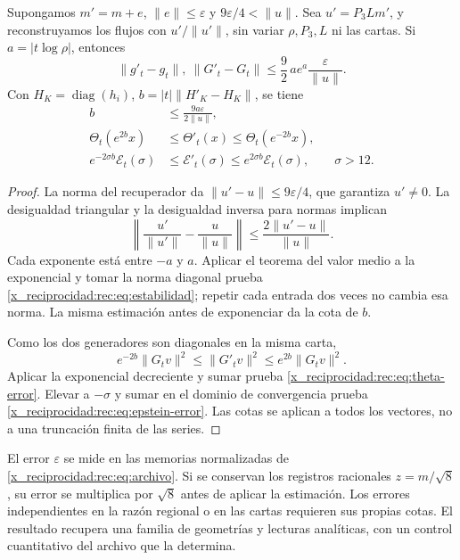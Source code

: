 \begin{theorem}
\label{x_reciprocidad:rec:thm:estabilidad}
Supongamos \(m'=m+e\), \(\|e\|\le\varepsilon\) y \(9\varepsilon/4<\|u\|\). Sea \(u'=P_3Lm'\), y reconstruyamos los flujos con \(u'/\|u'\|\), sin variar \(\rho,P_3,L\) ni las cartas. Si \(a=|t\log\rho|\), entonces
\begin{equation}
 \|g'_t-g_t\|,\ \|G'_t-G_t\|
 \le\frac92\,a e^a\frac{\varepsilon}{\|u\|}.
 \label{x_reciprocidad:rec:eq:estabilidad}
\end{equation}
Con \(H_K=\operatorname{diag}(h_i)\), \(b=|t|\|H'_K-H_K\|\), se tiene
\begin{align}
 b&\le\frac{9a\varepsilon}{2\|u\|},\nonumber\\
 \Theta_t(e^{2b}x)&\le\Theta'_t(x)\le\Theta_t(e^{-2b}x),\label{x_reciprocidad:rec:eq:theta-error}\\
 e^{-2\sigma b}\mathcal E_t(\sigma)&\le\mathcal E'_t(\sigma)
             \le e^{2\sigma b}\mathcal E_t(\sigma),\qquad\sigma>12.
 \label{x_reciprocidad:rec:eq:epstein-error}
\end{align}
\end{theorem}
\begin{proof}
La norma del recuperador da \(\|u'-u\|\le9\varepsilon/4\), que garantiza \(u'\ne0\). La desigualdad triangular y la desigualdad inversa para normas implican
\[
 \left\|\frac{u'}{\|u'\|}-\frac{u}{\|u\|}\right\|
 \le\frac{2\|u'-u\|}{\|u\|}.
\]
Cada exponente está entre \(-a\) y \(a\). Aplicar el teorema del valor medio a la exponencial y tomar la norma diagonal prueba \eqref{x_reciprocidad:rec:eq:estabilidad}; repetir cada entrada dos veces no cambia esa norma. La misma estimación antes de exponenciar da la cota de \(b\).

Como los dos generadores son diagonales en la misma carta,
\[
 e^{-2b}\|G_tv\|^2\le\|G'_tv\|^2\le e^{2b}\|G_tv\|^2.
\]
Aplicar la exponencial decreciente y sumar prueba \eqref{x_reciprocidad:rec:eq:theta-error}. Elevar a \(-\sigma\) y sumar en el dominio de convergencia prueba \eqref{x_reciprocidad:rec:eq:epstein-error}. Las cotas se aplican a todos los vectores, no a una truncación finita de las series.
\end{proof}

El error \(\varepsilon\) se mide en las memorias normalizadas de \eqref{x_reciprocidad:rec:eq:archivo}. Si se conservan los registros racionales \(z=m/\sqrt8\), su error se multiplica por \(\sqrt8\) antes de aplicar la estimación. Los errores independientes en la razón regional o en las cartas requieren sus propias cotas. El resultado recupera una familia de geometrías y lecturas analíticas, con un control cuantitativo del archivo que la determina.
